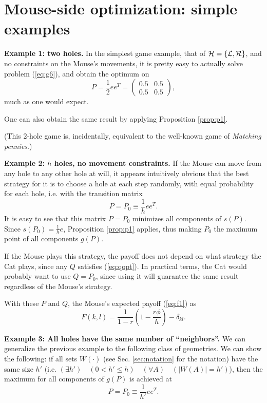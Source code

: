 \documentclass[12pt]{article}
\begin{document}
\section{Mouse-side optimization: simple examples}

{\bf Example 1: two holes.} In the simplest game example, that of $\cal{H}=\{L, R\}$, and no constraints on the Mouse's movements, it is pretty easy to actually solve problem (\ref{eq:g6}), and obtain the optimum on 
$$P = \frac{1}{2} e e^T =
\begin{pmatrix} 
 0.5  & 0.5 \\
 0.5  & 0.5  
\end{pmatrix},
$$
much as one would expect. 

One can also obtain the same result by applying Proposition \ref{prop:p1}.

(This 2-hole game is, incidentally, equivalent to the well-known game of {\em
  Matching pennies}.) 

{\bf Example 2: $h$ holes, no movement constraints.} If the Mouse can move from any hole to any other hole at will, it appears intuitively obvious that the best strategy for it is to choose a hole at each step randomly, with equal probability for each hole, i.e. with the transition matrix
$$
P=P_0 \equiv \frac{1}{h} ee^T.
$$
It is easy to see that this matrix $P=P_0$ minimizes all components of $s(P)$. Since $s(P_0)=\frac{1}{h} e$, Proposition \ref{prop:p1} applies, thus making $P_0$ the maximum point of all components $g(P)$.

If the Mouse plays this strategy, the payoff does not depend on what strategy the Cat plays, since any $Q$ satisfies (\ref{eq:qopt}). In practical terms, the Cat would probably want to use $Q=P_0$, since using it will guarantee the same result regardless of the Mouse's strategy.

With these $P$ and $Q$, the Mouse's expected payoff (\ref{eq:f1}) as 
\begin{equation}
\label{eq:payoff:ex2}
F(k,l) = \frac{1}{1-r} \left(1  - \frac{r\phi}{h}\right) - \delta_{kl}.
\end{equation}

{\bf Example 3: All holes have the same number of ``neighbors''.} We can generalize the previous example to the following class of geometries. We can show the following: if all sets $W(\cdot)$ (see Sec. \ref{sec:notation} for the notation)
have the same size  $h'$  (i.e.  $(\exists h') \quad (0<h'\le h) \quad (\forall A) \quad (|W(A)|=h')$), then the maximum for all components of $g(P)$ is achieved at 
$$
P=P_0 \equiv \frac{1}{h'} ee^T.
$$
\end{document}
